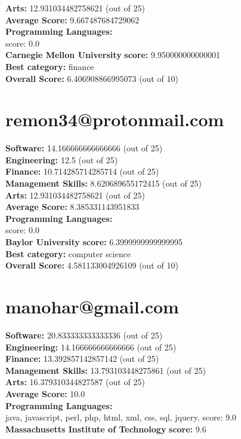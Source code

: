 \documentclass{article}
\begin{document}
\textbf{Arts:} 12.931034482758621 (out of 25)\\
\textbf{Average Score: } 9.667487684729062\\
\textbf{Programming Languages:} \\
score: 0.0\\
\textbf{Carnegie Mellon University} \textbf{score:} 9.950000000000001\\
\textbf{Best category: } finance\\
\textbf{Overall Score: }6.406908866995073 (out of 10)\section{remon34@protonmail.com}
\textbf{Software:} 14.166666666666666 (out of 25)\\
\textbf{Engineering: } 12.5 (out of 25)\\
\textbf{Finance:} 10.714285714285714 (out of 25)\\
\textbf{Management Skills:} 8.620689655172415 (out of 25)\\
\textbf{Arts:} 12.931034482758621 (out of 25)\\
\textbf{Average Score: } 8.385331143951833\\
\textbf{Programming Languages:} \\
score: 0.0\\
\textbf{Baylor University} \textbf{score:} 6.3999999999999995\\
\textbf{Best category: } computer science\\
\textbf{Overall Score: }4.581133004926109 (out of 10)\section{manohar@gmail.com}
\textbf{Software:} 20.833333333333336 (out of 25)\\
\textbf{Engineering: } 14.166666666666666 (out of 25)\\
\textbf{Finance:} 13.392857142857142 (out of 25)\\
\textbf{Management Skills:} 13.793103448275861 (out of 25)\\
\textbf{Arts:} 16.379310344827587 (out of 25)\\
\textbf{Average Score: } 10.0\\
\textbf{Programming Languages:} \\
java, javascript, perl, php, html, xml, css, sql, jquery, score: 9.0\\
\textbf{Massachusetts Institute of Technology} \textbf{score:} 9.6\\
\end{document}
